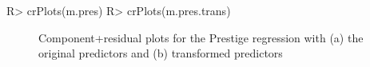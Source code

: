 \documentclass[
]{jss}
\begin{document}
\begin{CodeChunk}
\begin{CodeInput}
R> crPlots(m.pres)
R> crPlots(m.pres.trans)
\end{CodeInput}
\begin{figure}

{\centering {}\newline{}\newline

}

\caption[Component+residual plots for the Prestige regression with (a) the original predictors and (b) transformed predictors]{Component+residual plots for the Prestige regression with (a) the original predictors and (b) transformed predictors}\label{fig:CR-plots}
\end{figure}
\end{CodeChunk}
\end{document}
